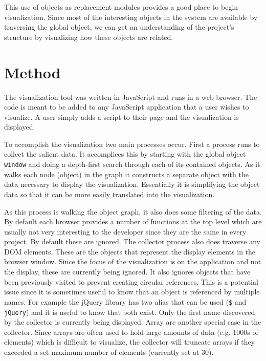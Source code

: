 \documentclass[]{article}
\begin{document}
This use of objects as replacement modules provides a good place to begin visualization. Since most of the interesting objects in the system are available by traversing the global object, we can get an understanding of the project's structure by visualizing how these objects are related.

\section{Method}
\label{sec:method}
The visualization tool was written in JavaScript and runs in a web browser. The code is meant to be added to any JavaScript application that a user wishes to visualize. A user simply adds a script to their page and the visualization is displayed.

To accomplish the visualization two main processes occur. First a process runs to collect the salient data. It accomplices this by starting with the global object {\tt window} and doing a depth-first search through each of its contained objects. As it walks each node (object) in the graph it constructs a separate object with the data necessary to display the visualization. Essentially it is simplifying the object data so that it can be more easily translated into the visualization.

As this process is walking the object graph, it also does some filtering of the data. By default each browser provides a number of functions at the top level which are usually not very interesting to the developer since they are the same in every project. By default these are ignored. The collector process also does traverse any DOM elements. These are the objects that represent the display elements in the browser window. Since the focus of the visualization is on the application and not the display, these are currently being ignored. It also ignores objects that have been previously visited to prevent creating circular references. This is a potential issue since it is sometimes useful to know that an object is referenced by multiple names. For example the jQuery library \cite{jquery} has two alias that can be used ({\tt \$} and {\tt jQuery}) and it is useful to know that both exist. Only the first name discovered by the collector is currently being displayed. Array are another special case in the collector. Since arrays are often used to hold large amounts of data (e.g. 1000s of elements) which is difficult to visualize, the collector will truncate arrays if they exceeded a set maximum number of elements (currently set at 30).
\end{document}
